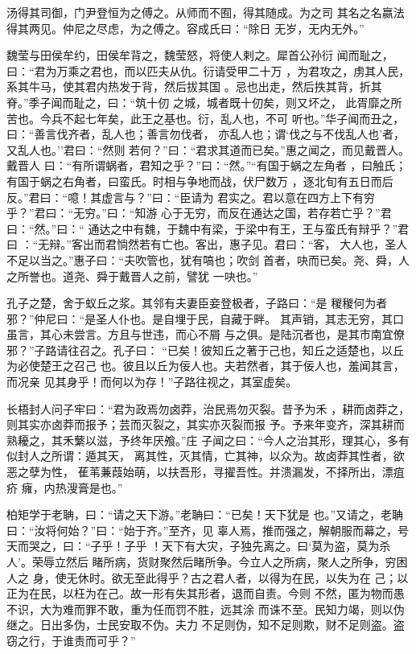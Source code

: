 \documentclass[]{article}
\begin{document}
汤得其司御，门尹登恒为之傅之。从师而不囿，得其随成。为之司
其名之名嬴法得其两见。仲尼之尽虑，为之傅之。容成氏曰：``除日
无岁，无内无外。''

魏莹与田侯牟约，田侯牟背之，魏莹怒，将使人剌之。犀首公孙衍
闻而耻之，曰：``君为万乘之君也，而以匹夫从仇。衍请受甲二十万
，为君攻之，虏其人民，系其牛马，使其君内热发于背，然后拔其国
。忌也出走，然后抶其背，折其脊。''季子闻而耻之，曰：``筑十仞
之城，城者既十仞矣，则又坏之，
此胥靡之所苦也。今兵不起七年矣，此王之基也。衍，乱人也，不可
听也。''华子闻而丑之，曰：``善言伐齐者，乱人也；善言勿伐者，
亦乱人也；谓`伐之与不伐乱人也'者，又乱人也。''君曰：``然则
若何？''曰：``君求其道而已矣。''惠之闻之，而见戴晋人。戴晋人
曰：``有所谓蜗者，君知之乎？''曰：``然。''``有国于蜗之左角者
，曰触氏；有国于蜗之右角者，曰蛮氏。时相与争地而战，伏尸数万
，逐北旬有五日而后反。''君曰：``噫！其虚言与？''曰：``臣请为
君实之。君以意在四方上下有穷乎？''君曰：``无穷。''曰：``知游
心于无穷，而反在通达之国，若存若亡乎？''君曰：``然。''曰：``
通达之中有魏，于魏中有梁，于梁中有王，王与蛮氏有辩乎？''君曰
：``无辩。''客出而君惝然若有亡也。客出，惠子见。君曰：``客，
大人也，圣人不足以当之。''惠子曰：``夫吹管也，犹有嗃也；吹剑
首者，吷而已矣。尧、舜，人之所誉也。道尧、舜于戴晋人之前，譬犹
一吷也。''

孔子之楚，舍于蚁丘之浆。其邻有夫妻臣妾登极者，子路曰：``是
稯稯何为者邪？''仲尼曰：``是圣人仆也。是自埋于民，自藏于畔。
其声销，其志无穷，其口虽言，其心未尝言。方且与世违，而心不屑
与之俱。是陆沉者也，是其市南宜僚邪？''子路请往召之。孔子曰：
``已矣！彼知丘之著于己也，知丘之适楚也，以丘为必使楚王之召己
也。彼且以丘为佞人也。夫若然者，其于佞人也，羞闻其言，而况亲
见其身乎！而何以为存！''子路往视之，其室虚矣。

长梧封人问子牢曰：``君为政焉勿卤莽，治民焉勿灭裂。昔予为禾
，耕而卤莽之，则其实亦卤莽而报予；芸而灭裂之，其实亦灭裂而报
予。予来年变齐，深其耕而熟耰之，其禾蘩以滋，予终年厌飧。''庄
子闻之曰：``今人之治其形，理其心，多有似封人之所谓：遁其天，
离其性，灭其情，亡其神，以众为。故卤莽其性者，欲恶之孽为性，
萑苇蒹葭始萌，以扶吾形，寻擢吾性。并溃漏发，不择所出，漂疽疥
癕，内热溲膏是也。''

柏矩学于老聃，曰：``请之天下游。''老聃曰：``已矣！天下犹是
也。''又请之，老聃曰：``汝将何始？''曰：``始于齐。''至齐，见
辜人焉，推而强之，解朝服而幕之，号天而哭之，曰：``子乎！子乎
！天下有大灾，子独先离之。曰`莫为盗，莫为杀人'。荣辱立然后
睹所病，货财聚然后睹所争。今立人之所病，聚人之所争，穷困人之
身，使无休时。欲无至此得乎？古之君人者，以得为在民，以失为在
己；以正为在民，以枉为在己。故一形有失其形者，退而自责。今则
不然，匿为物而愚不识，大为难而罪不敢，重为任而罚不胜，远其涂
而诛不至。民知力竭，则以伪继之。日出多伪，士民安取不伪。夫力
不足则伪，知不足则欺，财不足则盗。盗窃之行，于谁责而可乎？''
\end{document}
